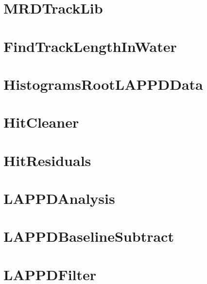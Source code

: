 \documentclass[twoside]{book}
\begin{document}
\chapter{M\-R\-D\-Track\-Lib}
\label{md_UserTools_FindMrdTracks_README}
\hypertarget{md_UserTools_FindMrdTracks_README}{}

\chapter{Find\-Track\-Length\-In\-Water}
\label{md_UserTools_FindTrackLengthInWater_README}
\hypertarget{md_UserTools_FindTrackLengthInWater_README}{}

\chapter{Histograms\-Root\-L\-A\-P\-P\-D\-Data}
\label{md_UserTools_HistogramsRootLAPPDData_README}
\hypertarget{md_UserTools_HistogramsRootLAPPDData_README}{}

\chapter{Hit\-Cleaner}
\label{md_UserTools_HitCleaner_README}
\hypertarget{md_UserTools_HitCleaner_README}{}

\chapter{Hit\-Residuals}
\label{md_UserTools_HitResiduals_README}
\hypertarget{md_UserTools_HitResiduals_README}{}

\chapter{L\-A\-P\-P\-D\-Analysis}
\label{md_UserTools_LAPPDAnalysis_README}
\hypertarget{md_UserTools_LAPPDAnalysis_README}{}

\chapter{L\-A\-P\-P\-D\-Baseline\-Subtract}
\label{md_UserTools_LAPPDBaselineSubtract_README}
\hypertarget{md_UserTools_LAPPDBaselineSubtract_README}{}

\chapter{L\-A\-P\-P\-D\-Filter}
\label{md_UserTools_LAPPDFilter_README}
\hypertarget{md_UserTools_LAPPDFilter_README}{}

\end{document}
